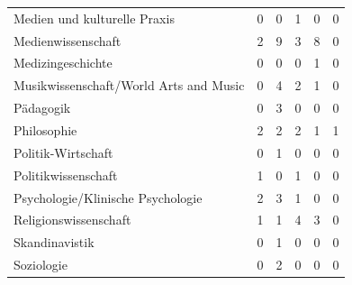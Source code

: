 \documentclass{scrartcl}
\begin{document}
\begin{landscape}
\begin{longtable}{L{7.5cm}ccccc}
Medien und kulturelle Praxis                         & 0                     &  0                       &  1                       & 0                    & 0                       \\
Medienwissenschaft                                   & 2                     &  9                       &  3                       & 8                    & 0                       \\
Medizingeschichte                                    & 0                     &  0                       &  0                       & 1                    & 0                       \\
Musikwissenschaft/World Arts and Music               & 0                     &  4                       &  2                       & 1                    & 0                       \\
Pädagogik                                            & 0                     &  3                       &  0                       & 0                    & 0                       \\
Philosophie                                          & 2                     &  2                       &  2                       & 1                    & 1                       \\
Politik-Wirtschaft                                   & 0                     &  1                       &  0                       & 0                    & 0                       \\
Politikwissenschaft                                  & 1                     &  0                       &  1                       & 0                    & 0                       \\
Psychologie/Klinische Psychologie                    & 2                     &  3                       &  1                       & 0                    & 0                       \\
Religionswissenschaft                                & 1                     &  1                       &  4                       & 3                    & 0                       \\
Skandinavistik                                       & 0                     &  1                       &  0                       & 0                    & 0                       \\
Soziologie                                           & 0                     &  2                       &  0                       & 0                    & 0                       \\

\end{longtable}
\end{landscape}
\end{document}
